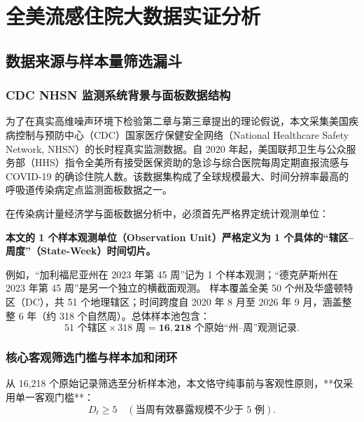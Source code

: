 \chapter{全美流感住院大数据实证分析}\label{ch:empirical}

\section{数据来源与样本量筛选漏斗}\label{sec:data_funnel}

\subsection{CDC NHSN 监测系统背景与面板数据结构}
为了在真实高维噪声环境下检验第二章与第三章提出的理论假说，本文采集美国疾病控制与预防中心（CDC）国家医疗保健安全网络（National Healthcare Safety Network, NHSN）的长时程真实监测数据。自 2020 年起，美国联邦卫生与公众服务部（HHS）指令全美所有接受医保资助的急诊与综合医院每周定期直报流感与 COVID-19 的确诊住院人数。该数据集构成了全球规模最大、时间分辨率最高的呼吸道传染病定点监测面板数据之一。

在传染病计量经济学与面板数据分析中，必须首先严格界定统计观测单位：
\begin{center}
\textbf{本文的 1 个样本观测单位（Observation Unit）严格定义为 1 个具体的“辖区--周度”（State-Week）时间切片。}
\end{center}
例如，“加利福尼亚州在 2023 年第 45 周”记为 1 个样本观测；“德克萨斯州在 2023 年第 45 周”是另一个独立的横截面观测。
样本覆盖全美 50 个州及华盛顿特区（DC），共 51 个地理辖区；时间跨度自 2020 年 8 月至 2026 年 9 月，涵盖整整 6 年（约 318 个自然周）。总体样本池包含：
\begin{equation}
51 \text{ 个辖区} \times 318 \text{ 周} = \mathbf{16{,}218} \text{ 个原始“州--周”观测记录}.
\end{equation}

\subsection{核心客观筛选门槛与样本加和闭环}
从 16,218 个原始记录筛选至分析样本池，本文恪守纯事前与客观性原则，**仅采用单一客观门槛**：
\begin{equation}
D_t \ge 5 \quad (\text{当周有效暴露规模不少于 5 例}).
\end{equation}

